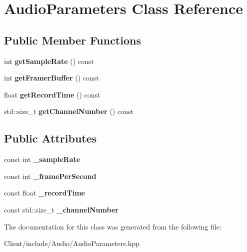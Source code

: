 \hypertarget{class_audio_parameters}{}\section{Audio\+Parameters Class Reference}
\label{class_audio_parameters}
\subsection*{Public Member Functions}
\begin{DoxyCompactItemize}
\item 
\mbox{\label{class_audio_parameters_aeacd7bd0438f3445886d10ce0bfa0a8c}} 
int {\bfseries get\+Sample\+Rate} () const
\item 
\mbox{\label{class_audio_parameters_a89d5c68a2c997262ac5a1b93db839b6a}} 
int {\bfseries get\+Framer\+Buffer} () const
\item 
\mbox{\label{class_audio_parameters_ae1a079b4a0dda11b07479b93e89863dc}} 
float {\bfseries get\+Record\+Time} () const
\item 
\mbox{\label{class_audio_parameters_a5be402b4ff7f30d3dc44d757ed83faba}} 
std\+::size\+\_\+t {\bfseries get\+Channel\+Number} () const
\end{DoxyCompactItemize}
\subsection*{Public Attributes}
\begin{DoxyCompactItemize}
\item 
\mbox{\label{class_audio_parameters_aa6b0ae10ae44735a62d66ce42cbf1c42}} 
const int {\bfseries \+\_\+sample\+Rate}
\item 
\mbox{\label{class_audio_parameters_af94336fef7592c3d98a5799c8556066a}} 
const int {\bfseries \+\_\+frame\+Per\+Second}
\item 
\mbox{\label{class_audio_parameters_aa6005b4cabdf57276aa389524da17f6b}} 
const float {\bfseries \+\_\+record\+Time}
\item 
\mbox{\label{class_audio_parameters_ac63e7fcdbb3231ed3a8759566229497c}} 
const std\+::size\+\_\+t {\bfseries \+\_\+channel\+Number}
\end{DoxyCompactItemize}


The documentation for this class was generated from the following file\+:\begin{DoxyCompactItemize}
\item 
Client/include/\+Audio/Audio\+Parameters.\+hpp\end{DoxyCompactItemize}

